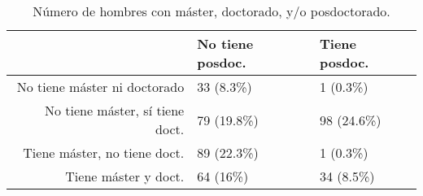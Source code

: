 \begin{table}[ht]
\centering
\begin{tabular}{rll}
  \hline
 & No tiene posdoc. & Tiene posdoc. \\ 
  \hline
No tiene máster ni doctorado & 33 (8.3\%) & 1 (0.3\%) \\ 
  No tiene máster, sí tiene doct. & 79 (19.8\%) & 98 (24.6\%) \\ 
  Tiene máster, no tiene doct. & 89 (22.3\%) & 1 (0.3\%) \\ 
  Tiene máster y doct. & 64 (16\%) & 34 (8.5\%) \\ 
   \hline
\end{tabular}
\caption{Número de hombres con máster, doctorado, y/o posdoctorado.} 
\label{tab:countmen}
\end{table}
